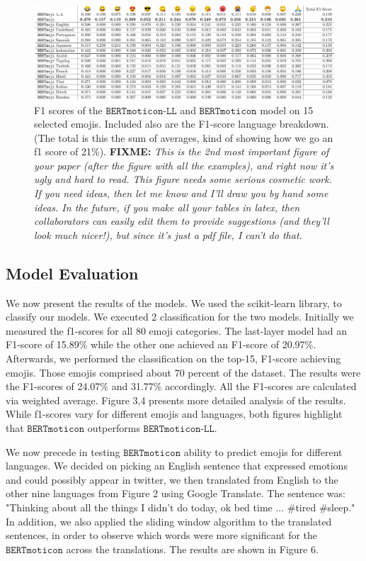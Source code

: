 \documentclass[11pt]{article}
\newcommand{\fixme}[1]{{\color{red} \textbf{FIXME:} {\textit {#1}}}}
\newcommand{\bertmoji}{\texttt{BERTmoticon}}
\newcommand{\bertmojill}{\texttt{BERTmoticon-LL}}
\begin{document}
\begin{figure}
    \centering
    \includegraphics[width=\textwidth]{images/f1_score_table_fix.pdf}
    \caption{
        F1 scores of the $\bertmojill$ and $\bertmoji$ model on 15 selected emojis. Included also are the F1-score language breakdown. (The total is this the sum of averages, kind of showing how we go an f1 score of 21\%).
        \fixme{This is the 2nd most important figure of your paper (after the figure with all the examples), and right now it's ugly and hard to read.  This figure needs some serious cosmetic work.  If you need ideas, then let me know and I'll draw you by hand some ideas.  In the future, if you make all your tables in latex, then collaborators can easily edit them to provide suggestions (and they'll look much nicer!), but since it's just a pdf file, I can't do that.}
    }
    \label{fig:tweets_per_day}
\end{figure}


\subsection{Model Evaluation}

We now present the results of the models. We used the scikit-learn \cite{} library, to classify our models.
We executed 2 classification for the two models. Initially we measured the f1-scores for all 80 emoji categories.
The last-layer model had an F1-score of 15.89\% while the other one achieved an F1-score of 20.97\%. 
Afterwards, we performed the classification on the top-15, F1-score achieving emojis. 
Those emojis comprised about 70 percent of the dataset.
The results were the F1-scores of 24.07\% and 31.77\% accordingly.
All the F1-scores are calculated via weighted average. Figure 3,4 presents more detailed analysis of the results.
While f1-scores vary for different emojis and languages,
both figures highlight that  $\bertmoji$ outperforms $\bertmojill$. 

We now precede in testing $\bertmoji$ ability to predict emojis for different languages.
We decided on picking an English sentence that expressed emotions and could possibly appear in twitter,
we then translated from English to the other nine languages from Figure 2 using Google Translate.
The sentence was: "Thinking about all the things I didn't do today, ok bed time ... \#tired \#sleep."
In addition, we also applied the sliding window algorithm to the translated sentences,
in order to observe which words were more significant for the $\bertmoji$ across the translations.
The results are shown in Figure 6. 
\end{document}
